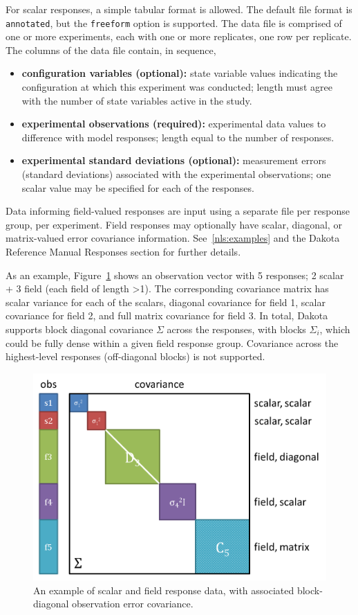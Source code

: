 For scalar responses, a simple tabular format is allowed.  The default
file format is {\tt annotated}, but the {\tt freeform} option is
supported.  The data file is comprised of one or more experiments,
each with one or more replicates, one row per replicate.  The columns
of the data file contain, in sequence,
\begin{itemize}
\item {\bf configuration variables (optional):} state variable values
  indicating the configuration at which this experiment was conducted;
  length must agree with the number of state variables active in the
  study.
\item {\bf experimental observations (required):} experimental data
  values to difference with model responses; length equal to the number 
  of responses.
\item {\bf experimental standard deviations (optional):} measurement
  errors (standard deviations) associated with the experimental observations; 
  one scalar value may be specified for each of the responses.
\end{itemize}

Data informing field-valued responses are input using a separate file
per response group, per experiment.  Field responses may optionally
have scalar, diagonal, or matrix-valued error covariance information.
See~\ref{nls:examples} and the Dakota Reference Manual Responses
section for further details.

As an example, Figure~\ref{fig:input:obs_err_cov} shows an observation
vector with 5 responses; 2 scalar + 3 field (each field of length
\textgreater 1).  The corresponding covariance matrix has scalar
variance for each of the scalars, diagonal covariance for field 1,
scalar covariance for field 2, and full matrix covariance for field 3.
In total, Dakota supports block diagonal covariance $\Sigma$ across
the responses, with blocks $\Sigma_i$, which could be fully dense
within a given field response group.  Covariance across the
highest-level responses (off-diagonal blocks) is not supported.
\begin{figure}[htbp!]
  \centering
  \includegraphics[scale=0.5]{images/ObsErrorCovariance}
  \caption{An example of scalar and field response data, with
    associated block-diagonal observation error covariance.}
  \label{fig:input:obs_err_cov}
\end{figure}

